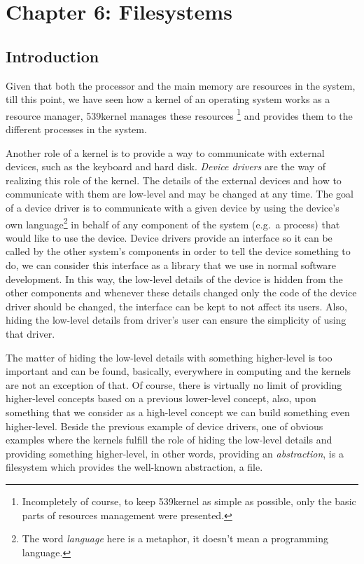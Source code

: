 \chapter{Chapter 6: Filesystems}\label{ch-filesystems}

\section{Introduction}\label{introduction}

Given that both the processor and the main memory are resources in the
system, till this point, we have seen how a kernel of an operating
system works as a resource manager, 539kernel manages these resources
\footnote{Incompletely of course, to keep 539kernel as simple as
  possible, only the basic parts of resources management were presented.}
and provides them to the different processes in the system.

Another role of a kernel is to provide a way to communicate with
external devices, such as the keyboard and hard disk. \emph{Device
drivers} are the way of realizing this role of the kernel. The details
of the external devices and how to communicate with them are low-level
and may be changed at any time. The goal of a device driver is to
communicate with a given device by using the device's own
language\footnote{The word \emph{language} here is a metaphor, it
  doesn't mean a programming language.} in behalf of any component of
the system (e.g.~a process) that would like to use the device. Device
drivers provide an interface so it can be called by the other system's
components in order to tell the device something to do, we can consider
this interface as a library that we use in normal software development.
In this way, the low-level details of the device is hidden from the
other components and whenever these details changed only the code of the
device driver should be changed, the interface can be kept to not affect
its users. Also, hiding the low-level details from driver's user can
ensure the simplicity of using that driver.

The matter of hiding the low-level details with something higher-level
is too important and can be found, basically, everywhere in computing
and the kernels are not an exception of that. Of course, there is
virtually no limit of providing higher-level concepts based on a
previous lower-level concept, also, upon something that we consider as a
high-level concept we can build something even higher-level. Beside the
previous example of device drivers, one of obvious examples where the
kernels fulfill the role of hiding the low-level details and providing
something higher-level, in other words, providing an \emph{abstraction},
is a filesystem which provides the well-known abstraction, a file.

